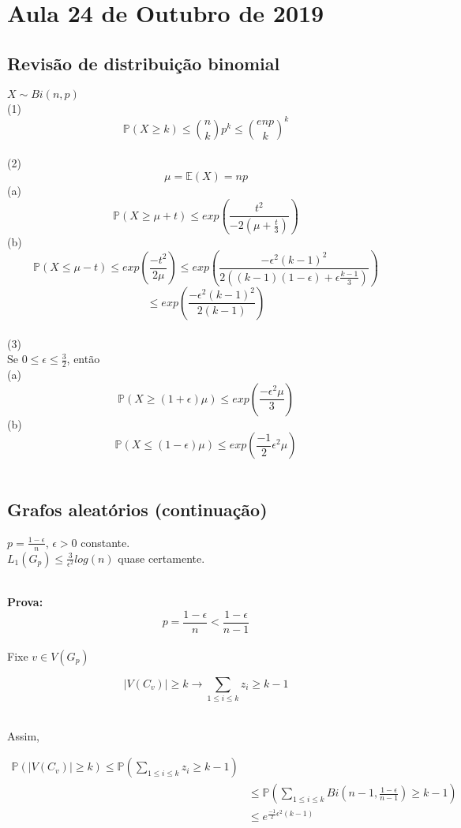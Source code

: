 \section{Aula 24 de Outubro de 2019}
\label{2019_10_24}

\subsection{Revisão de distribuição binomial}
$X\sim Bi(n,p)$
\\
(1) 
\[\mathbb{P}(X \geq k) \leq {n\choose k}p^{k} \leq {enp\choose k}^{k}\]
\\
(2)
\[\mu = \mathbb{E}(X) = np \]
(a)
\[\mathbb{P}(X \geq \mu +t) \leq exp(\frac{t^{2}}{-2(\mu+\frac{t}{3})})\]
(b)
\[\mathbb{P}(X \leq \mu -t) \leq exp(\frac{-t^{2}}{2\mu}) \leq exp(\frac{-\epsilon^{2}(k-1)^{2}}{2((k-1)(1-\epsilon)+\epsilon\frac{k-1}{3})}) \]
\[\leq exp(\frac{-\epsilon^{2}(k-1)^{2}}{2(k-1)}) \]
\\
(3)
\\
Se $ 0 \leq \epsilon \leq \frac{3}{2} $, então
\\
(a)
\\
\[\mathbb{P}(X \geq (1+\epsilon)\mu) \leq exp(\frac{-\epsilon^{2}\mu}{3}) \]
(b)
\[\mathbb{P}(X \leq (1-\epsilon)\mu) \leq exp(\frac{-1}{2}\epsilon^{2}\mu) \]
\\
\subsection{Grafos aleatórios (continuação)}
\begin{teorema}
$p = \frac{1 - \epsilon}{n} $, $\epsilon > 0$ constante.
\\
$L_{1}(G_{p}) \leq \frac{3}{\epsilon^{2}} log(n)$ quase certamente.
\end{teorema}
\\
\textbf{Prova:}\\

\[p = \frac{1-\epsilon}{n} < \frac{1-\epsilon}{n-1}\]
\\
Fixe $v\in V(G_{p})$\\

\begin{fato}
\[|V(C_{v})| \geq k \rightarrow \sum_{1\leq i \leq k} z_{i} \geq k-1\]
\end{fato}
\\
Assim,

\begin{align*}
	\mathbb{P}(|V(C_{v})|\geq k) \leq \mathbb{P}( \sum_{1\leq i \leq k} z_{i} \geq k-1) \\
	&\leq \mathbb{P}(\sum_{1\leq i \leq k} Bi(n-1,\frac{1-\epsilon}{n-1}) \geq k-1) \\
	&\leq e^{\frac{-1}{2}\epsilon^{2}(k-1)}
\end{align*}

